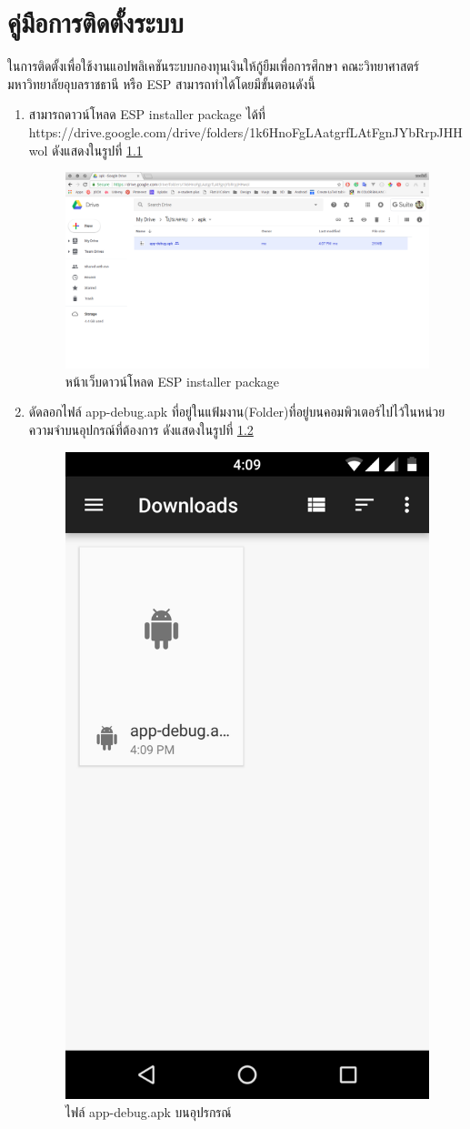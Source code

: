 \chapter{คู่มือการติดตั้งระบบ}
ในการติดตั้งเพื่อใช้งานแอปพลิเคชันระบบกองทุนเงินให้กู้ยืมเพื่อการศึกษา คณะวิทยาศาสตร์ มหาวิทยาลัยอุบลราชธานี หรือ ESP สามารถทำได้โดยมีขั้นตอนดังนี้
\begin{enumerate}
	\item สามารถดาวน์โหลด ESP installer package ได้ที่ https://drive.google.com/drive/folders/1k6HnoFgLAatgrfLAtFgnJYbRrpJHHwol ดังแสดงในรูปที่ \ref{Fig:dl1}
	\begin{figure}[H]
		\centering
		\includegraphics[width=\columnwidth]{Figures/7/installApp/dl}
		\caption{หน้าเว็บดาวน์โหลด ESP installer package}
		\label{Fig:dl1}
	\end{figure}
	\item ดัดลอกไฟล์ app-debug.apk ที่อยู่ในแฟ้มงาน(Folder)ที่อยู่บนคอมพิวเตอร์ไปไว้ในหน่วยความจำบนอุปกรณ์ที่ต้องการ ดังแสดงในรูปที่ \ref{Fig:dl2}
	\begin{figure}[H]
		\centering
		\includegraphics[width=0.3\columnwidth]{Figures/7/installApp/1}
		\caption{ไฟล์ app-debug.apk บนอุปรกรณ์}
		\label{Fig:dl2}

\end{figure}
\end{enumerate}
